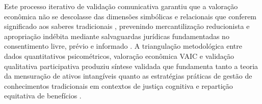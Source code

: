 Este processo iterativo de validação comunicativa \cite{Habermas1984} garantiu que a valoração econômica não se descolasse das dimensões simbólicas e relacionais que conferem significado aos saberes tradicionais \cite{Agrawal2002}, prevenindo mercantilização reducionista \cite{Polanyi1944} e apropriação indébita mediante salvaguardas jurídicas fundamentadas no consentimento livre, prévio e informado \cite{Wynberg2015}. A triangulação metodológica \cite{Denzin1978} entre dados quantitativos psicométricos, valoração econômica VAIC e validação qualitativa participativa produziu síntese validada que fundamenta tanto a teoria da mensuração de ativos intangíveis \cite{Lev2001} quanto as estratégias práticas de gestão de conhecimentos tradicionais em contextos de justiça cognitiva \cite{Santos2007} e repartição equitativa de benefícios \cite{Schroeder2020}.










